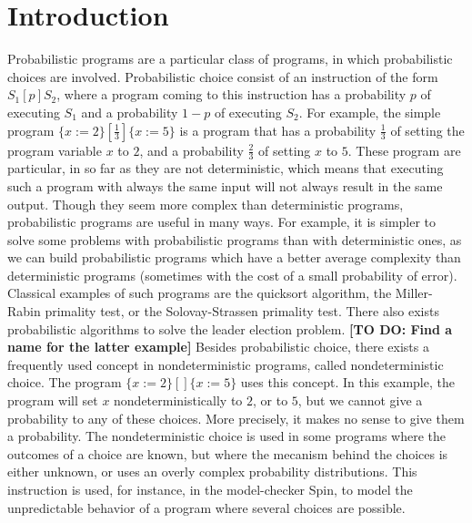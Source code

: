 \documentclass[a4paper,10pt]{llncs}
\newcommand\todo[1]{{\color{red}\textbf{[TO DO:  #1]}}}
\begin{document}
\section{Introduction}
\label{sec:intro}
Probabilistic programs are a particular class of programs, in which probabilistic choices are involved. Probabilistic choice consist of an instruction of the form $S_1 [p] S_2$, where a program coming to this instruction has a probability $p$ of executing $S_1$ and a probability $1-p$ of executing $S_2$. For example, the simple program $\{ x := 2 \} [\frac{1}{3}] \{ x := 5 \}$ is a program that has a probability $\frac{1}{3}$ of setting the program variable $x$ to $2$, and a probability $\frac{2}{3}$ of setting $x$ to $5$. These program are particular, in so far as they are not deterministic, which means that executing such a program with always the same input will not always result in the same output. Though they seem more complex than deterministic programs, probabilistic programs are useful in many ways. For example, it is simpler to solve some problems with probabilistic programs than with deterministic ones, as we can build probabilistic programs which have a better average complexity than deterministic programs (sometimes with the cost of a small probability of error). Classical examples of such programs are the quicksort algorithm, the Miller-Rabin primality test, or the Solovay-Strassen primality test. There also exists probabilistic algorithms to solve the leader election problem. \todo{Find a name for the latter example}\newline 
Besides probabilistic choice, there exists a frequently used concept in nondeterministic programs, called nondeterministic choice. The program $\{ x := 2 \} [\!] \{ x := 5 \}$ uses this concept. In this example, the program will set $x$ nondeterministically to $2$, or to $5$, but we cannot give a probability to any of these choices. More precisely, it makes no sense to give them a probability. The nondeterministic choice is used in some programs where the outcomes of a choice are known, but where the mecanism behind the choices is either unknown, or uses an overly complex probability distributions. This instruction is used, for instance, in the model-checker Spin, to model the unpredictable behavior of a program where several choices are possible.\newline
\end{document}
